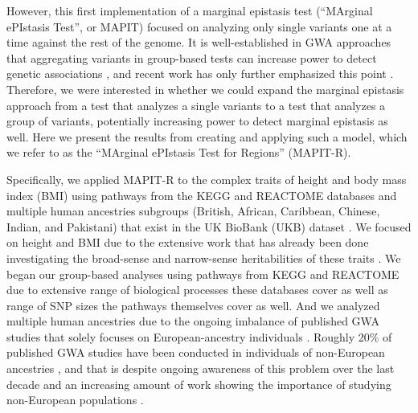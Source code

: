 \documentclass[12pt,a4paper]{article}
\begin{document}
However, this first implementation of a marginal epistasis test (``MArginal ePIstasis Test'', or MAPIT) focused on analyzing only single variants one at a time against the rest of the genome. It is well-established in GWA approaches that aggregating variants in group-based tests can increase power to detect genetic associations \citep{Subramanian2005,Cantor2010,Wang2010,Lee2012,Carbonetto2013,Mooney2014,Gamazon2015,de2016}, and recent work has only further emphasized this point \citep{Nakka2016,Zhu2018,Cheng2019,Sun2019}. Therefore, we were interested in whether we could expand the marginal epistasis approach from a test that analyzes a single variants to a test that analyzes a group of variants, potentially increasing power to detect marginal epistasis as well. Here we present the results from creating and applying such a model, which we refer to as the ``MArginal ePIstasis Test for Regions'' (MAPIT-R). 

Specifically, we applied MAPIT-R to the complex traits of height and body mass index (BMI) using pathways from the KEGG and REACTOME databases \citep{Liberzon2011} and multiple human ancestries subgroups (British, African, Caribbean, Chinese, Indian, and Pakistani) that exist in the UK BioBank (UKB) dataset \citep{Sudlow2015}. We focused on height and BMI due to the extensive work that has already been done investigating the broad-sense and narrow-sense heritabilities of these traits \citep{Yang2010,Elks2012,Visscher2012,Finucane2015,Speed2017,Wainschtein2019}. We began our group-based analyses using pathways from KEGG and REACTOME due to extensive range of biological processes these databases cover as well as range of SNP sizes the pathways themselves cover as well. And we analyzed multiple human ancestries due to the ongoing imbalance of published GWA studies that solely focuses on European-ancestry individuals \citep{Need2009,Popejoy2016,Gurdasani2019,Martin2019,Sirugo2019}. Roughly 20\% of published GWA studies have been conducted in individuals of non-European ancestries \citep{Gurdasani2019,Martin2019,Sirugo2019}, and that is despite ongoing awareness of this problem over the last decade \citep{Need2009,Popejoy2016} and an increasing amount of work showing the importance of studying non-European populations \citep{Dumitrescu2011,Martin2017a,Martin2017b,Mogil2018,Bien2019,Duncan2019,Kuchenbaecker2019,Wojcik2019,Zhong2019,Marnetto2020,Mostafavi2020}. 

\end{document}
